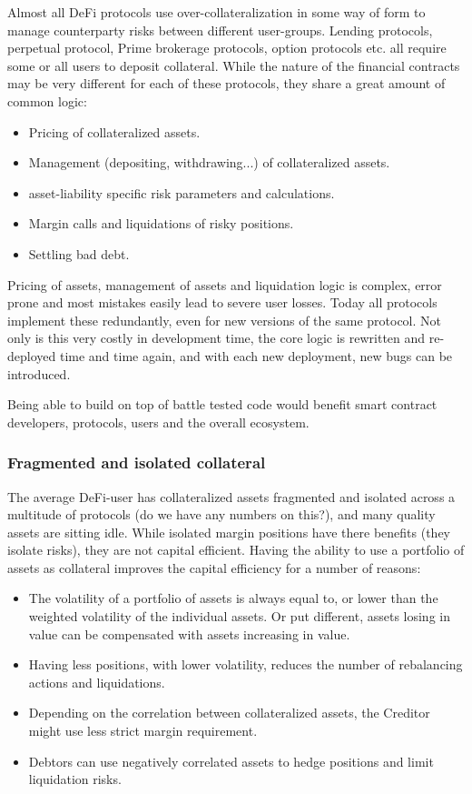 \documentclass[sigconf,nonacm]{acmart}
\begin{document}
Almost all DeFi protocols use over-collateralization in some way of form to manage counterparty risks between different user-groups.
Lending protocols, perpetual protocol, Prime brokerage protocols, option protocols etc. all require some or all users to deposit collateral.
While the nature of the financial contracts may be very different for each of these protocols, they share a great amount of common logic:
\begin{itemize}
    \item Pricing of collateralized assets.
    \item Management (depositing, withdrawing...) of collateralized assets.
    \item asset-liability specific risk parameters and calculations.
    \item Margin calls and liquidations of risky positions.
    \item Settling bad debt.
\end{itemize}

Pricing of assets, management of assets and liquidation logic is complex, error prone and most mistakes easily lead to severe user losses.
Today all protocols implement these redundantly, even for new versions of the same protocol. 
Not only is this very costly in development time, the core logic is rewritten and re-deployed time and time again, and with each new deployment, new bugs can be introduced.

Being able to build on top of battle tested code would benefit smart contract developers, protocols, users and the overall ecosystem.

\subsubsection{Fragmented and isolated collateral}
\label{subsubsec:fragmented-collateral}

The average DeFi-user has collateralized assets fragmented and isolated across a multitude of protocols (do we have any numbers on this?), and many quality assets are sitting idle.
While isolated margin positions have there benefits (they isolate risks), they are not capital efficient.
Having the ability to use a portfolio of assets as collateral improves the capital efficiency for a number of reasons:
\begin{itemize}
    \item The volatility of a portfolio of assets is always equal to, or lower than the weighted volatility of the individual assets.
    Or put different, assets losing in value can be compensated with assets increasing in value.
    \item Having less positions, with lower volatility, reduces the number of rebalancing actions and liquidations.
    \item Depending on the correlation between collateralized assets, the Creditor might use less strict margin requirement.
    \item Debtors can use negatively correlated assets to hedge positions and limit liquidation risks.
\end{itemize}
\end{document}
